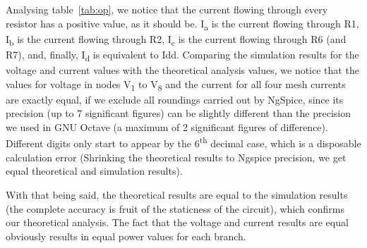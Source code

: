 Analysing table~\ref{tab:op}, we notice that the current flowing through every resistor has a positive value, as it should be. I\textsubscript{a} is the current flowing through R1, I\textsubscript{b} is the current flowing through R2, I\textsubscript{c} is the current flowing through R6 (and R7), and, finally, I\textsubscript{d} is equivalent to Idd.
Comparing the simulation results for the voltage and current values with the theoretical analysis values, we notice that the values for voltage in nodes V\textsubscript{1} to V\textsubscript{8} and the current for all four mesh currents are exactly equal, if we exclude all roundings carried out by NgSpice, since its precision (up to 7 significant figures) can be slightly different than the precision we used in GNU Octave (a maximum of 2 significant figures of difference). Different digits only start to appear by the 6\textsuperscript{th} decimal case, which is a disposable calculation error (Shrinking the theoretical results to Ngspice precision, we get equal theoretical and simulation results).

With that being said, the theoretical results are equal to the simulation results (the complete accuracy is fruit of the staticness of the circuit), which confirms our theoretical analysis. The fact that the voltage and current results are equal obviously results in equal power values for each branch.


